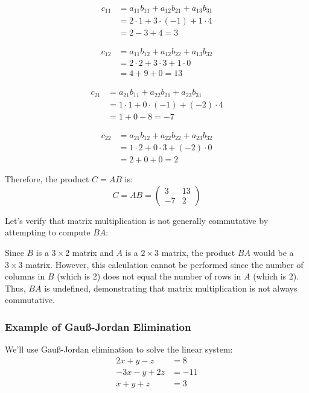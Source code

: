 \begin{align*}
c_{11} &= a_{11}b_{11} + a_{12}b_{21} + a_{13}b_{31} \\
&= 2 \cdot 1 + 3 \cdot (-1) + 1 \cdot 4 \\
&= 2 - 3 + 4 = 3
\end{align*}

\begin{align*}
c_{12} &= a_{11}b_{12} + a_{12}b_{22} + a_{13}b_{32} \\
&= 2 \cdot 2 + 3 \cdot 3 + 1 \cdot 0 \\
&= 4 + 9 + 0 = 13
\end{align*}

\begin{align*}
c_{21} &= a_{21}b_{11} + a_{22}b_{21} + a_{23}b_{31} \\
&= 1 \cdot 1 + 0 \cdot (-1) + (-2) \cdot 4 \\
&= 1 + 0 - 8 = -7
\end{align*}

\begin{align*}
c_{22} &= a_{21}b_{12} + a_{22}b_{22} + a_{23}b_{32} \\
&= 1 \cdot 2 + 0 \cdot 3 + (-2) \cdot 0 \\
&= 2 + 0 + 0 = 2
\end{align*}

Therefore, the product $C = AB$ is:
\begin{equation*}
C = AB = 
\begin{pmatrix}
3 & 13 \\
-7 & 2
\end{pmatrix}
\end{equation*}

Let's verify that matrix multiplication is not generally commutative by attempting to compute $BA$:

Since $B$ is a $3 \times 2$ matrix and $A$ is a $2 \times 3$ matrix, the product $BA$ would be a $3 \times 3$ matrix. However, this calculation cannot be performed since the number of columns in $B$ (which is 2) does not equal the number of rows in $A$ (which is 2). Thus, $BA$ is undefined, demonstrating that matrix multiplication is not always commutative.

\subsubsection{Example of Gauß-Jordan Elimination}

We'll use Gauß-Jordan elimination to solve the linear system:
\begin{align*}
2x + y - z &= 8 \\
-3x - y + 2z &= -11 \\
x + y + z &= 3
\end{align*}

